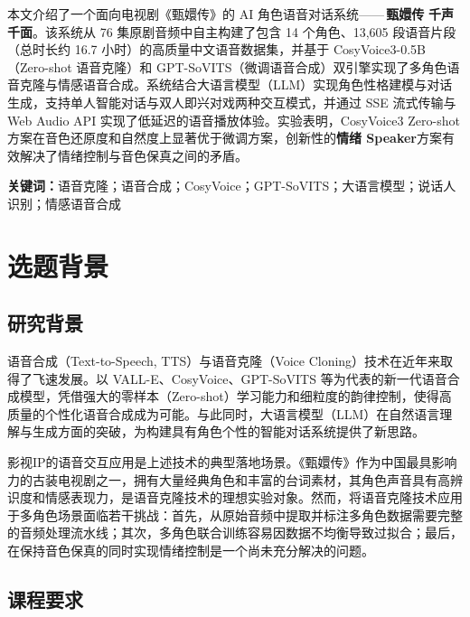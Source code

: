 \documentclass[12pt,a4paper]{article}
\begin{document}
本文介绍了一个面向电视剧《甄嬛传》的 AI 角色语音对话系统------\,\textbf{甄嬛传\,\textperiodcentered\,千声千面}。该系统从 76 集原剧音频中自主构建了包含 14 个角色、13,605 段语音片段（总时长约 16.7 小时）的高质量中文语音数据集，并基于 CosyVoice3-0.5B（Zero-shot 语音克隆）和 GPT-SoVITS（微调语音合成）双引擎实现了多角色语音克隆与情感语音合成。系统结合大语言模型（LLM）实现角色性格建模与对话生成，支持单人智能对话与双人即兴对戏两种交互模式，并通过 SSE 流式传输与 Web Audio API 实现了低延迟的语音播放体验。实验表明，CosyVoice3 Zero-shot 方案在音色还原度和自然度上显著优于微调方案，创新性的\textbf{情绪 Speaker}方案有效解决了情绪控制与音色保真之间的矛盾。

\vspace{0.8cm}
\noindent\hspace*{2em}\textbf{关键词：}语音克隆；语音合成；CosyVoice；GPT-SoVITS；大语言模型；说话人识别；情感语音合成

\newpage
\tableofcontents
\newpage
{}
\setcounter{page}{1}

\section{选题背景}
\label{sec:background}

\subsection{研究背景}

语音合成（Text-to-Speech, TTS）与语音克隆（Voice Cloning）技术在近年来取得了飞速发展。以 VALL-E、CosyVoice、GPT-SoVITS 等为代表的新一代语音合成模型，凭借强大的零样本（Zero-shot）学习能力和细粒度的韵律控制，使得高质量的个性化语音合成成为可能。与此同时，大语言模型（LLM）在自然语言理解与生成方面的突破，为构建具有角色个性的智能对话系统提供了新思路。

影视IP的语音交互应用是上述技术的典型落地场景。《甄嬛传》作为中国最具影响力的古装电视剧之一，拥有大量经典角色和丰富的台词素材，其角色声音具有高辨识度和情感表现力，是语音克隆技术的理想实验对象。然而，将语音克隆技术应用于多角色场景面临若干挑战：首先，从原始音频中提取并标注多角色数据需要完整的音频处理流水线；其次，多角色联合训练容易因数据不均衡导致过拟合；最后，在保持音色保真的同时实现情绪控制是一个尚未充分解决的问题。

\subsection{课程要求}
\end{document}
